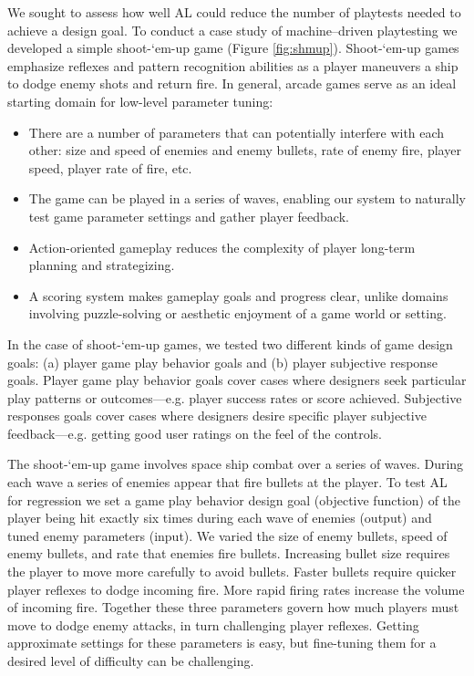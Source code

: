 \documentclass{sig-alternate}
\begin{document}
We sought to assess how well AL could reduce the number of playtests needed to achieve a design goal.
To conduct a case study of machine--driven playtesting we developed a simple shoot-`em-up game (Figure \ref{fig:shmup}).
Shoot-`em-up games emphasize reflexes and pattern recognition abilities as a player maneuvers a ship to dodge enemy shots and return fire.
%
In general, arcade games serve as an ideal starting domain for low-level parameter tuning:
\begin{itemize}
\item There are a number of parameters that can potentially interfere with each other: size and speed of enemies and enemy bullets, rate of enemy fire, player speed, player rate of fire, etc.
\item The game can be played in a series of waves, enabling our system to naturally test game parameter settings and gather player feedback.
\item Action-oriented gameplay reduces the complexity of player long-term planning and strategizing.
\item A scoring system makes gameplay goals and progress clear, unlike domains involving puzzle-solving or aesthetic enjoyment of a game world or setting.
\end{itemize}
%
In the case of shoot-`em-up games, we tested two different kinds of game design goals: (a) player game play behavior goals and (b) player subjective response goals.
Player game play behavior goals cover cases where designers seek particular play patterns or outcomes---e.g. player success rates or score achieved. 
Subjective responses goals cover cases where designers desire specific player subjective feedback---e.g. getting good user ratings on the feel of the controls.


The shoot-`em-up game involves space ship combat over a series of waves.
During each wave a series of enemies appear that fire bullets at the player. 
To test AL for regression we set a game play behavior design goal (objective function) of the player being hit exactly six times during each wave of enemies (output) and tuned enemy parameters (input).
We varied the size of enemy bullets, speed of enemy bullets, and rate that enemies fire bullets. 
Increasing bullet size requires the player to move more carefully to avoid bullets. 
Faster bullets require quicker player reflexes to dodge incoming fire. 
More rapid firing rates increase the volume of incoming fire. 
Together these three parameters govern how much players must move to dodge enemy attacks, in turn challenging player reflexes. 
Getting approximate settings for these parameters is easy, but fine-tuning them for a desired level of difficulty can be challenging. 
\end{document}
